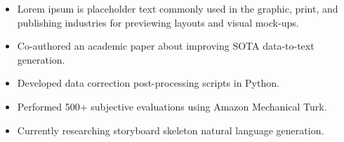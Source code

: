 \documentclass[10pt,a4paper,ragged2e]{altacv}
\begin{document}


\begin{fullwidth}
\makecvheader
\end{fullwidth}



\begin{itemize}
\item Lorem ipsum is placeholder text commonly used in the graphic, print, and publishing industries for previewing layouts and visual mock-ups.
\end{itemize}

\divider

\begin{itemize}
\item Co-authored an academic paper about improving SOTA data-to-text generation.
\item Developed data correction post-processing scripts in Python.
\item Performed 500+ subjective evaluations using Amazon Mechanical Turk.
\item Currently researching storyboard skeleton natural language generation.
\end{itemize}

\divider
\end{document}
